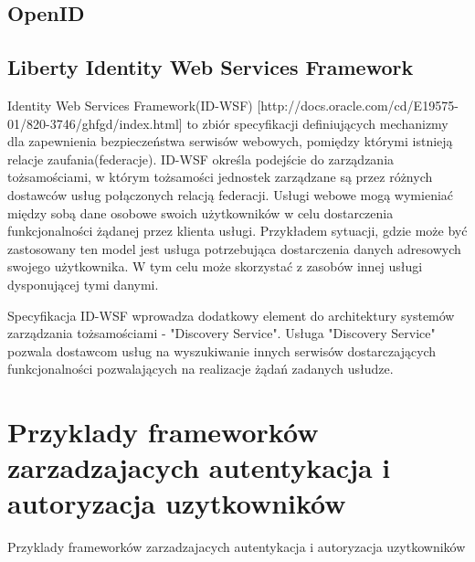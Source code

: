 \subsection{OpenID}

\subsection{Liberty Identity Web Services Framework}

	Identity Web Services Framework(ID-WSF) [http://docs.oracle.com/cd/E19575-01/820-3746/ghfgd/index.html] to zbiór specyfikacji definiujących mechanizmy dla zapewnienia bezpieczeństwa serwisów webowych, pomiędzy którymi istnieją relacje zaufania(federacje). ID-WSF określa podejście do zarządzania tożsamościami, w którym tożsamości jednostek zarządzane są przez różnych dostawców usług połączonych relacją federacji. Usługi webowe mogą wymieniać między sobą dane osobowe swoich użytkowników w celu dostarczenia funkcjonalności żądanej przez klienta usługi. Przykładem sytuacji, gdzie może być zastosowany ten model jest usługa potrzebująca dostarczenia danych adresowych swojego użytkownika. W tym celu może skorzystać z zasobów innej usługi dysponującej tymi danymi.

	Specyfikacja ID-WSF wprowadza dodatkowy element do architektury systemów zarządzania tożsamościami - "Discovery Service". Usługa "Discovery Service" pozwala dostawcom usług na wyszukiwanie innych serwisów dostarczających funkcjonalności pozwalających na realizacje żądań zadanych usłudze.

	

\section{Przyklady frameworków zarzadzajacych autentykacja i autoryzacja uzytkowników}
\label{sec:frameworki}

Przyklady frameworków zarzadzajacych autentykacja i autoryzacja uzytkowników

